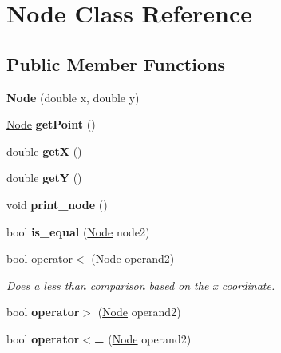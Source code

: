 \hypertarget{classNode}{}\section{Node Class Reference}
\label{classNode}
\subsection*{Public Member Functions}
\begin{DoxyCompactItemize}
\item 
\mbox{\label{classNode_ab488e53f2acfc84ef0cacc1951f92c3d}} 
{\bfseries Node} (double x, double y)
\item 
\mbox{\label{classNode_a667cd139237fd82f1d4d6e784310c42d}} 
\hyperlink{classNode}{Node} {\bfseries get\+Point} ()
\item 
\mbox{\label{classNode_a8d8ccf6a6da7717ea6aa67e52c7c9017}} 
double {\bfseries getX} ()
\item 
\mbox{\label{classNode_a8877121bf44537ccbe2f3c441fa3b664}} 
double {\bfseries getY} ()
\item 
\mbox{\label{classNode_aaad9d5a79f3819ba7e2ddd2b196d300f}} 
void {\bfseries print\+\_\+node} ()
\item 
\mbox{\label{classNode_aa93a3a9846c909197ba00bfd6fb4a549}} 
bool {\bfseries is\+\_\+equal} (\hyperlink{classNode}{Node} node2)
\item 
bool \hyperlink{classNode_ab0452101dad47b23bad5419963d85648}{operator$<$} (\hyperlink{classNode}{Node} operand2)
\begin{DoxyCompactList}\small\item\em Does a less than comparison based on the x coordinate. \end{DoxyCompactList}\item 
\mbox{\label{classNode_affe7b2f79e4364a4a37937a9b6e48861}} 
bool {\bfseries operator$>$} (\hyperlink{classNode}{Node} operand2)
\item 
\mbox{\label{classNode_af2e6eb91242511cfdc0b3e971e236602}} 
bool {\bfseries operator$<$=} (\hyperlink{classNode}{Node} operand2)

\end{DoxyCompactItemize}
